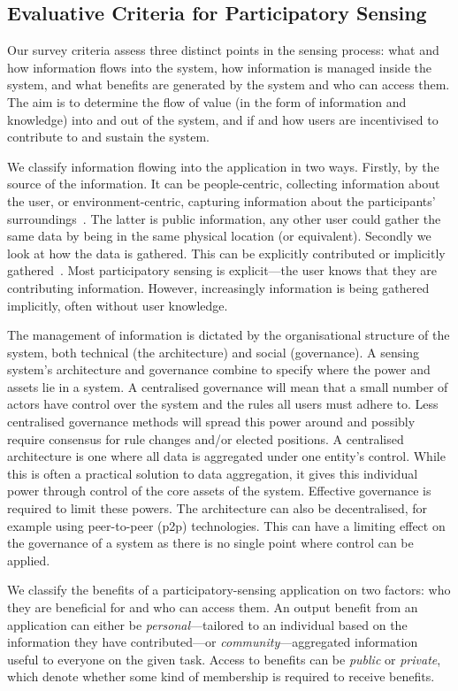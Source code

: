 \subsection{Evaluative Criteria for Participatory Sensing}

Our survey criteria assess three distinct points in the sensing process: what and how information flows into the system, how information is managed inside the system, and what benefits are generated by the system and who can access them. The aim is to determine the flow of value (in the form of information and knowledge) into and out of the system, and if and how users are incentivised to contribute to and sustain the system.

We classify information flowing into the application in two ways. 
Firstly, by the source of the information. It can be people-centric, collecting information about the user, or environment-centric, capturing information about the participants' surroundings~\citep{Kanhere2013}. The latter is public information, any other user could gather the same data by being in the same physical location (or equivalent). Secondly we look at how the data is gathered. This can be explicitly contributed or implicitly gathered~\citep{Shadbolt2013}. Most participatory sensing is explicit---the user knows that they are contributing information. However, increasingly information is being gathered implicitly, often without user knowledge.

The management of information is dictated by the organisational structure of the system, both technical (the architecture) and social (governance). A sensing system's architecture and governance combine to specify where the power and assets lie in a system. A centralised governance will mean that a small number of actors have control over the system and the rules all users must adhere to. Less centralised governance methods will spread this power around and possibly require consensus for rule changes and/or elected positions. A centralised architecture is one where all data is aggregated under one entity's control. 
While this is often a practical solution to data aggregation, it gives this individual power through control of the core assets of the system. 
Effective governance is required to limit these powers. The architecture can also be decentralised, for example using peer-to-peer (p2p) technologies. This can have a limiting effect on the governance of a system as there is no single point where control can be applied. 

We classify the benefits of a participatory-sensing application on two factors: who they are beneficial for and who can access them. 
An output benefit from an application can either be \emph{personal}---tailored to an individual based on the information they have contributed---or \emph{community}---aggregated information useful to everyone on the given task. 
Access to benefits can be \emph{public} or \emph{private}, which denote whether some kind of membership is required to receive benefits.

